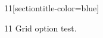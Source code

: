 \documentclass[paper=A4]{ropas-poster}
\begin{document}
\begin{postergrid}{1}{1}[sectiontitle-color=blue]
\begin{posterblock}{1}{1}
Grid option test.
\end{posterblock}
\end{postergrid}
\end{document}
